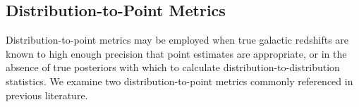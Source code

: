 \documentclass[fleqn,usenatbib,useAMS]{mnras}
\newcommand{\PersonalTag}[3]{{\color{#2}{$^{#1}$ [#3}]}}
\newcommand{\aim}[1]{\PersonalTag{Alex}{violet}{#1}}
\newcommand{\revone}[2]{{\color{black}{#2}}}
\begin{document}







\subsection{Distribution-to-Point Metrics}
\label{sec:pointdist}

Distribution-to-point metrics may be employed when true galactic redshifts are known to high enough precision that point estimates are appropriate, or in the absence of true posteriors with which to calculate distribution-to-distribution statistics. 
We examine two distribution-to-point metrics commonly referenced in previous literature. 
\end{document}
